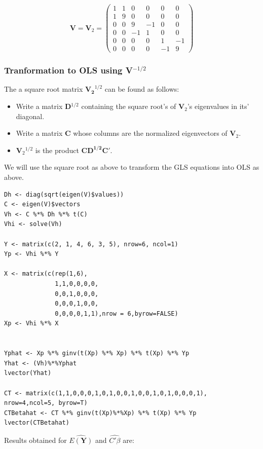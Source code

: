 \documentclass[11pt]{article}
\begin{document}
\[ 
\mathbf{V} = \mathbf{V}_2 = 
\begin{pmatrix}
1 & 1 & 0 & 0 & 0 & 0 \\
1 & 9 & 0 & 0 & 0 & 0 \\
0 & 0 & 9 & -1& 0 & 0 \\
0 & 0 & -1& 1 & 0 & 0 \\
0 & 0 & 0 & 0 & 1 & -1 \\
0 & 0 & 0 & 0 & -1 & 9
\end{pmatrix}
\]
\subsubsection{Tranformation to OLS using \textbf{V$^{\mathrm{-1/2}}$}}
\label{sec-2-2-1}


The a square root matrix $\mathbf{V_2}^{1/2}$ can be found as follows:

\begin{itemize}
\item Write a matrix \textbf{D$^{\mathrm{1/2}}$} containing the square root's of \textbf{V$_2$}'s eigenvalues in its' diagonal.
\item Write a matrix \textbf{C} whose columns are the normalized eigenvectors of \textbf{V$_2$}.
\item \textbf{V$_2$$^{\mathrm{1/2}}$} is the product $\mathbf{CD^{1/2}C'}$.
\end{itemize}

We will use the square root as above to transform the GLS equations
into OLS as above.
     

\begin{verbatim}
Dh <- diag(sqrt(eigen(V)$values))
C <- eigen(V)$vectors 
Vh <- C %*% Dh %*% t(C)
Vhi <- solve(Vh)

Y <- matrix(c(2, 1, 4, 6, 3, 5), nrow=6, ncol=1)
Yp <- Vhi %*% Y

X <- matrix(c(rep(1,6),
              1,1,0,0,0,0,
              0,0,1,0,0,0,
              0,0,0,1,0,0,
              0,0,0,0,1,1),nrow = 6,byrow=FALSE)
Xp <- Vhi %*% X


Yphat <- Xp %*% ginv(t(Xp) %*% Xp) %*% t(Xp) %*% Yp
Yhat <- (Vh)%*%Yphat
lvector(Yhat)

CT <- matrix(c(1,1,0,0,0,1,0,1,0,0,1,0,0,1,0,1,0,0,0,1), nrow=4,ncol=5, byrow=T)
CTBetahat <- CT %*% ginv(t(Xp)%*%Xp) %*% t(Xp) %*% Yp
lvector(CTBetahat)
\end{verbatim}

Results obtained for $\widehat{E(\mathbf{Y})}$ and $\widehat{C'\beta}$ are:
\end{document}

